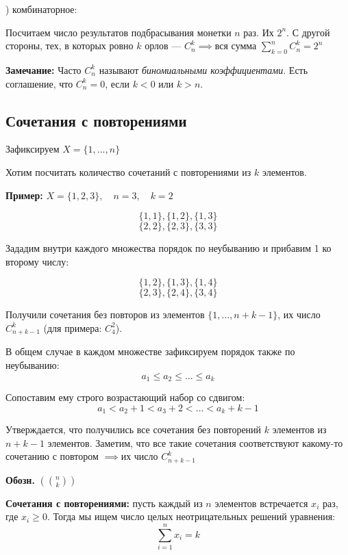 \documentclass[10pt, a4paper]{article}
\begin{document}
\medskip
{}) комбинаторное:

\noindent Посчитаем число результатов подбрасывания монетки $n$ раз. Их $2^n$. С другой стороны, тех, в которых ровно $k$ орлов — $C_n^k \implies \text{вся сумма } \sum_{k=0}^{n} C_n^k = 2^n \quad$

\vspace{0.3cm}
\noindent \textbf{Замечание:} Часто $C_n^k$ называют \textit{биномиальными коэффициентами}. Есть соглашение, что $C_n^k = 0$, если $k < 0$ или $k > n$.

\subsection*{Сочетания с повторениями}

\noindent Зафиксируем $X = \{1, \dots, n\}$

\noindent Хотим посчитать количество сочетаний с повторениями из $k$ элементов.

\vspace{0.2cm}
\noindent \textbf{Пример:} $X = \{1, 2, 3\}, \quad n = 3, \quad k = 2$

$$\{1, 1\}, \{1, 2\}, \{1, 3\}$$
$$\{2, 2\}, \{2, 3\}, \{3, 3\}$$

\noindent Зададим внутри каждого множества порядок по неубыванию и прибавим 1 ко второму числу:

$$\{1, 2\}, \{1, 3\}, \{1, 4\}$$
$$\{2, 3\}, \{2, 4\}, \{3, 4\}$$

\noindent Получили сочетания без повторов из элементов $\{1, \dots, n+k-1\}$, их число $C_{n+k-1}^k$ (для примера: $C_4^2$).

\vspace{0.2cm}
\noindent В общем случае в каждом множестве зафиксируем порядок также по неубыванию:
$$a_1 \le a_2 \le \dots \le a_k$$

\noindent Сопоставим ему строго возрастающий набор со сдвигом:
$$a_1 < a_2+1 < a_3+2 < \dots < a_k+k-1$$

\noindent Утверждается, что получились все сочетания без повторений $k$ элементов из $n+k-1$ элементов. Заметим, что все такие сочетания соответствуют какому-то сочетанию с повтором $\implies \text{их число } C_{n+k-1}^k$

\medskip
\noindent \textbf{Обозн.} $\left( \!\! \binom{n}{k} \!\! \right)$

\vspace{0.3cm}
\noindent \textbf{Сочетания с повторениями:} пусть каждый из $n$ элементов встречается $x_i$ раз, где $x_i \ge 0$.
Тогда мы ищем число целых неотрицательных решений уравнения:
$$ \sum_{i=1}^n x_i = k $$
\end{document}
